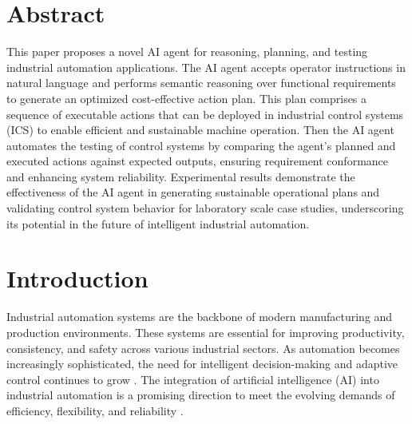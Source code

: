 \begin{bibunit}
\thispagestyle{plain}

\newcommand{\commentcolour}[3]{\textcolor{#3}{[\textbf{#1:} #2]}}
\newcommand{\commentVV}[1]{\commentcolour{VV}{#1}{orange}}
\newcommand{\VV}[1]{\textcolor{orange}{#1}}
\newcommand{\soutVV}[1]{\VV{\sout{#1}}}
\newcommand{\corrVV}[2]{\sout{#1} \VV{#2}}
\newcommand{\N}{{\mathbb N}}
\newcommand{\NN}{\mathcal N}
\newcommand{\etal}{\it et al. \normalfont}

\section*{Abstract}

This paper proposes a novel AI agent for reasoning, planning, and testing industrial automation applications. The AI agent accepts operator instructions in natural language and performs semantic reasoning over functional requirements to generate an optimized cost-effective action plan. This plan comprises a sequence of executable actions that can be deployed in industrial control systems (ICS) to enable efficient and sustainable machine operation. Then the AI agent automates the testing of control systems by comparing the agent's planned and executed actions against expected outputs, ensuring requirement conformance and enhancing system reliability. Experimental results demonstrate the effectiveness of the AI agent in generating sustainable operational plans and validating control system behavior for laboratory scale case studies, underscoring its potential in the future of intelligent industrial automation.
    
    
    \section{Introduction}
    \label{Introduction}
    
    Industrial automation systems are the backbone of modern manufacturing and production environments. These systems are essential for improving productivity, consistency, and safety across various industrial sectors. As automation becomes increasingly sophisticated, the need for intelligent decision-making and adaptive control continues to grow \cite{khan2020management}. The integration of artificial intelligence (AI) into industrial automation is a promising direction to meet the evolving demands of efficiency, flexibility, and reliability \cite{mathew2023artificial}.
    

\end{bibunit}
